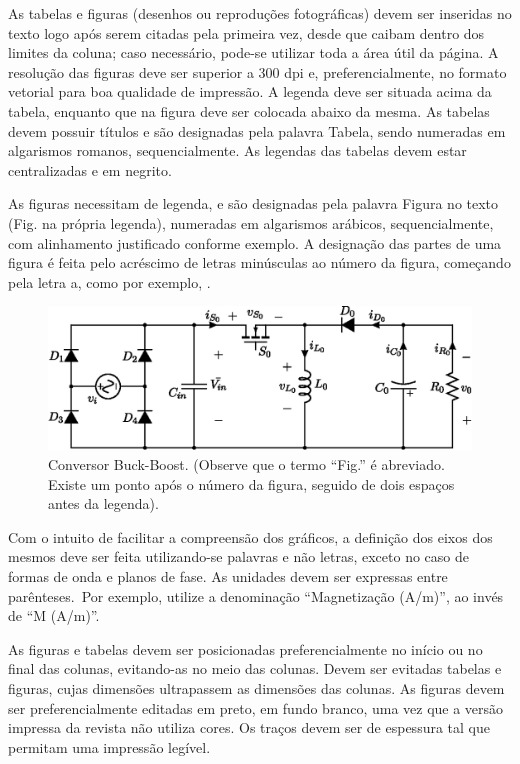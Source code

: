 As tabelas e figuras (desenhos ou reproduções fotográficas) devem ser inseridas no texto logo após serem citadas pela primeira vez, desde que caibam dentro dos limites da coluna; caso necessário, pode-se utilizar toda a área útil da página. A resolução das figuras deve ser superior a 300 dpi e, preferencialmente, no formato vetorial para boa qualidade de impressão. A legenda deve ser situada acima da tabela, enquanto que na figura deve ser colocada abaixo da mesma. As tabelas devem possuir títulos e são designadas pela palavra Tabela, sendo numeradas em algarismos romanos, sequencialmente. As legendas das tabelas devem estar centralizadas e em negrito.  

As figuras necessitam de legenda, e são designadas pela palavra Figura no texto (Fig. na própria legenda), numeradas em algarismos arábicos, sequencialmente, com alinhamento justificado conforme exemplo. A designação das partes de uma figura é feita pelo acréscimo de letras minúsculas ao número da figura, começando pela letra a, como por exemplo, .

\begin{figure}[!t]
	\centering
    \includegraphics[width=0.9\linewidth]{Figs/RET-BuckBoost}
	\caption{Conversor Buck-Boost. (Observe que o termo ``Fig.'' é abreviado. Existe um ponto após o número da figura, seguido de dois espaços antes da legenda).}
	\label{fig:BuckBoost}
\end{figure}



Com o intuito de facilitar a compreensão dos gráficos, a definição dos eixos dos mesmos deve ser feita utilizando-se palavras e não letras, exceto no caso de formas de onda e planos de fase. As unidades devem ser expressas entre parênteses.~Por exemplo, utilize a denominação ``Magnetização (A/m)'', ao invés de ``M (A/m)''.

As figuras e tabelas devem ser posicionadas preferencialmente no início ou no final das colunas, evitando-as no meio das colunas. Devem ser evitadas tabelas e figuras, cujas dimensões ultrapassem as dimensões das colunas. As figuras devem ser preferencialmente editadas em preto, em fundo branco, uma vez que a versão impressa da revista não utiliza cores. Os traços devem ser de espessura tal que permitam uma impressão legível.



